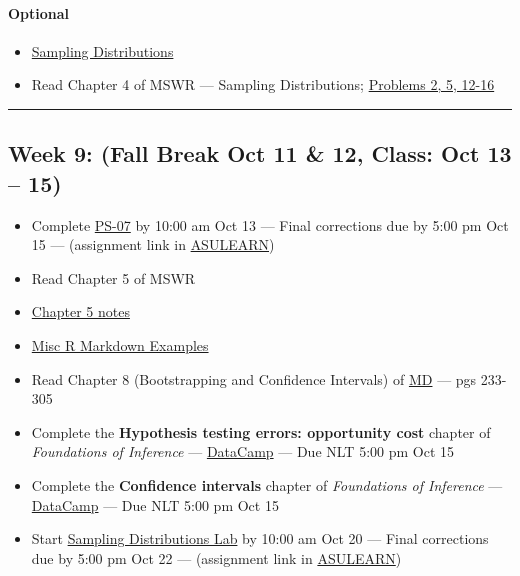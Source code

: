 \documentclass[
]{article}
\begin{document}
\begin{rmdoptional}
\hypertarget{optional}{%
\paragraph*{Optional}\label{optional}}

\begin{itemize}
\item
  \href{../Handouts/EVuniform.html}{Sampling Distributions}
\item
  Read Chapter 4 of MSWR --- Sampling Distributions;
  \href{../Homework/Chapter4HWK.Rmd}{Problems 2, 5, 12-16}
\end{itemize}
\end{rmdoptional}

\begin{center}\rule{0.5\linewidth}{0.5pt}\end{center}

\hypertarget{week-9-fall-break-oct-11-12-class-oct-13-15}{%
\subsection*{Week 9: (Fall Break Oct 11 \& 12, Class: Oct 13 --
15)}\label{week-9-fall-break-oct-11-12-class-oct-13-15}}

\begin{itemize}
\item
  Complete
  \href{https://classroom.github.com/classrooms/87543903-stt3850-fall2021}{PS-07}
  by 10:00 am Oct 13 --- Final corrections due by 5:00 pm Oct 15 ---
  (assignment link in
  \href{https://asulearn.appstate.edu/course/view.php?id=131169}{ASULEARN})
\item
  Read Chapter 5 of MSWR
\item
  \href{../Notes/Children/BootStrap2.html}{Chapter 5 notes}
\item
  \href{../Rmarkdown/MiscRmarkdown.html}{Misc R Markdown Examples}
\item
  Read Chapter 8 (Bootstrapping and Confidence Intervals) of
  \href{https://moderndive.com}{MD} --- pgs 233-305
\item
  Complete the \textbf{Hypothesis testing errors: opportunity cost}
  chapter of \emph{Foundations of Inference} ---
  \href{https://app.datacamp.com/groups/stt3850-fall2021/assignments}{DataCamp}
  --- Due NLT 5:00 pm Oct 15
\item
  Complete the \textbf{Confidence intervals} chapter of
  \emph{Foundations of Inference} ---
  \href{https://app.datacamp.com/groups/stt3850-fall2021/assignments}{DataCamp}
  --- Due NLT 5:00 pm Oct 15
\item
  Start
  \href{https://classroom.github.com/classrooms/87543903-stt3850-fall2021}{Sampling
  Distributions Lab} by 10:00 am Oct 20 --- Final corrections due by
  5:00 pm Oct 22 --- (assignment link in
  \href{https://asulearn.appstate.edu/course/view.php?id=131169}{ASULEARN})
\end{itemize}
\end{document}
